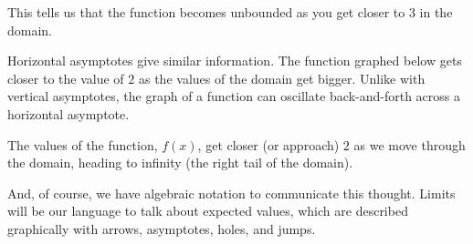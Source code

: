 \documentclass{ximera}
\begin{document}
This tells us that the function becomes unbounded as you get closer to $3$ in the domain. 




Horizontal asymptotes give similar information.  The function graphed below gets closer to the value of $2$ as the values of the domain get bigger.   Unlike with vertical asymptotes, the graph of a function can oscillate back-and-forth across a horizontal asymptote.




\begin{image}
\end{image}


The values of the function, $f(x)$, get closer (or approach) $2$ as we move through the domain, heading to infinity (the right tail of the domain).  

And, of course, we have algebraic notation to communicate this thought. Limits will be our language to talk about expected values, which are described graphically with arrows, asymptotes, holes, and jumps.
\end{document}
